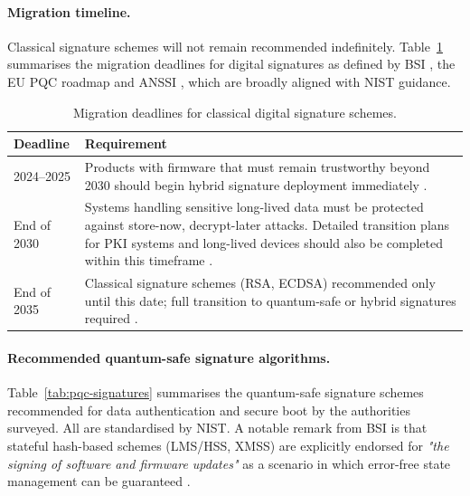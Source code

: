 \paragraph{Migration timeline.}
Classical signature schemes will not remain recommended indefinitely. Table~\ref{tab:migration-timeline} summarises the migration deadlines for digital signatures as defined by BSI \cite{bsi_crypto_key_length}, the EU PQC roadmap \cite{EU_post_quantum_transition} and ANSSI \cite{anssi_post_quantum_crypto}, which are broadly aligned with NIST guidance.

\begin{table}[h]
    \centering
    \caption{Migration deadlines for classical digital signature schemes.}
    \label{tab:migration-timeline}
    \begin{tabular}{lp{9cm}}
        \hline
        \textbf{Deadline} & \textbf{Requirement} \\
        \hline
        2024--2025 & Products with firmware that must remain trustworthy beyond 2030 should begin hybrid signature deployment immediately \cite{anssi_post_quantum_crypto}. \\
        End of 2030 & Systems handling sensitive long-lived data must be protected against store-now, decrypt-later attacks. Detailed transition plans for PKI systems and long-lived devices should also be completed within this timeframe \cite{EU_post_quantum_transition}. \\
        End of 2035 & Classical signature schemes (RSA, ECDSA) recommended only until this date; full transition to quantum-safe or hybrid signatures required \cite{bsi_crypto_key_length}. \\
        \hline
    \end{tabular}
\end{table}

\paragraph{Recommended quantum-safe signature algorithms.}
Table~\ref{tab:pqc-signatures} summarises the quantum-safe signature schemes recommended for data authentication and secure boot by the authorities surveyed. All are standardised by NIST. A notable remark from BSI is that stateful hash-based schemes (LMS/HSS, XMSS) are explicitly endorsed for \emph{"the signing of software and firmware updates"} as a scenario in which error-free state management can be guaranteed \cite{bsi_crypto_key_length}.

